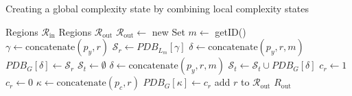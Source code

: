 \documentclass[../../main.tex]{subfiles}
\begin{document}
\begin{algorithm}
   \caption{Creating a global complexity state by combining local complexity states}
   \label{alg:complexity_estimation}

   \begin{algorithmic}[1]
         \REQUIRE Regions $\mathcal{R}_{\text{in}}$
         \ENSURE Regions $\mathcal{R}_{\text{out}}$
         \STATE $\mathcal{R}_{\text{out}} \leftarrow $ new Set
         \STATE $m \leftarrow$ getID() 
            \STATE $\gamma \leftarrow \text{concatenate}(p_y, r)$
            \STATE $\mathcal{S}_r \leftarrow PDB_{L_m}[\gamma]$
            \STATE $\delta \leftarrow \text{concatenate}(p_y, r, m)$
            \STATE $PDB_G[\delta] \leftarrow \mathcal{S}_r$
            \STATE $\mathcal{S}_t \leftarrow \emptyset$
               \STATE $\delta \leftarrow \text{concatenate}(p_y, r, m)$
               \STATE $\mathcal{S}_t \leftarrow \mathcal{S}_t \cup PDB_G[\delta]$
            \ENDFOR
               \STATE $c_r \leftarrow 1$ 
            \ELSE 
               \STATE $c_r \leftarrow 0$ 
            \ENDIF
            \STATE $\kappa \leftarrow \text{concatenate}(p_c, r)$
               \STATE $PDB_G[\kappa] \leftarrow c_r$
               \STATE add $r$ to $\mathcal{R}_{\text{out}}$
            \ENDIF
         \ENDFOR
         \RETURN $R_{\text{out}}$
   \end{algorithmic}
\end{algorithm}
\end{document}
